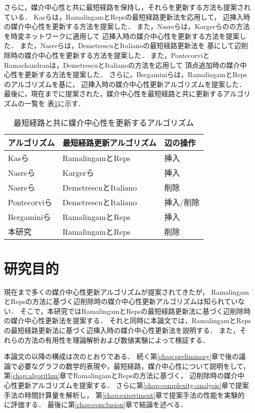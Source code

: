 さらに，媒介中心性と共に最短経路を保持し，それらを更新する方法も提案されている．
Kasらは，RamalingamとRepsの最短経路更新法\cite{Ramalingam1996}を応用して，
辺挿入時の媒介中心性を更新する方法を提案した\cite{Kas2013}．
また，Nasreらは，Kargerらの\cite{Karger1993}の方法を時変ネットワークに適用して
辺挿入時の媒介中心性を更新する方法を提案し\cite{Nasre2014a}た．
また，Nasreらは，DemetrescuとItalianoの最短経路更新法\cite{Demetrescu2003}を
基にして辺削除時の媒介中心性を更新する方法を提案した\cite{Nasre2014b}．
また，PontecorviとRamachandranは，DemetrescuとItalianoの方法を応用して
頂点追加時の媒介中心性を更新する方法を提案した\cite{Pontecorvi2015}．
さらに，Bergaminiらは，RamalingamとRepsのアルゴリズムを基に，
辺挿入時の媒介中心性更新アルゴリズムを提案した\cite{Bergamini2017}．
最後に，現在までに提案された，媒介中心性を最短経路と共に更新するアルゴリズムの一覧を
表\ref{tab:comparison-of-algorithms}に示す．

\begin{table}[tb]
  \centering
  \caption{最短経路と共に媒介中心性を更新するアルゴリズム}
  \label{tab:comparison-of-algorithms}
  \begin{tabular}{lll}
    \hline
    アルゴリズム & 最短経路更新アルゴリズム & 辺の操作 \\ \hline
    Kasら\cite{Kas2013} & RamalingamとReps\cite{Ramalingam1996} & 挿入 \\ \hline
    Nasreら\cite{Nasre2014a} & Kargerら\cite{Karger1993} & 挿入 \\ \hline
    Nasreら\cite{Nasre2014b} & DemetrescuとItaliano\cite{Demetrescu2003} & 削除 \\ \hline
    Pontecorviら\cite{Pontecorvi2015} & DemetrescuとItaliano\cite{Demetrescu2003} & 挿入/削除 \\ \hline
    Bergaminiら\cite{Bergamini2017} & RamalingamとReps\cite{Ramalingam1996} & 挿入 \\ \hline
    本研究 & RamalingamとReps\cite{Ramalingam1996} & 削除 \\ \hline
  \end{tabular}
\end{table}

\section{研究目的}

現在まで多くの媒介中心性更新アルゴリズムが提案されてきたが，
RamalingamとRepsの方法に基づく辺削除時の媒介中心性更新アルゴリズムは知られていない．
そこで，本研究ではRamalingamとRepsの最短経路更新法に基づく辺削除時の媒介中心性更新法を提案する．
それと同時に本論文では，RamalingamとRepsの最短経路更新法に基づく辺挿入時の媒介中心性更新法を説明する．
また，それらの方法の有用性を理論解析および数値実験によって検証する．

本論文の以降の構成は次のとおりである．
続く第\ref{chap:preliminary}章で後の議論で必要なグラフの数学的表現や，最短経路，媒介中心性について説明をして，
第\ref{chap:algorithm}章でRamalingamとRepsの方法に基づく，
辺削除時の媒介中心性更新アルゴリズムを提案する．
さらに第\ref{chap:complexity-analysis}章で提案手法の時間計算量を解析し，
第\ref{chap:experiment}章で提案手法の性能を実験的に評価する．
最後に第\ref{chap:conclusion}章で結論を述べる．
